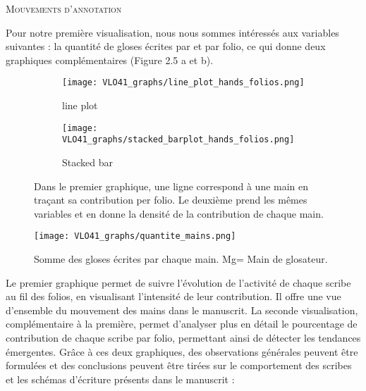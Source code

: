 \documentclass[a4paper, twoside, 12pt]{book}
\begin{document}
{\textsc{Mouvements d'annotation}

Pour notre première visualisation, nous nous sommes intéressés aux variables suivantes : la quantité de gloses écrites par et par folio, ce qui donne deux graphiques complémentaires (Figure 2.5 a et b).

\begin{figure}[H]
    \begin{subfigure}{0.55\textwidth}
    \centering
    \texttt{[image: VLO41\_graphs/line\_plot\_hands\_folios.png]}
    \caption{line plot}
    \end{subfigure}
    \begin{subfigure}{0,55\linewidth}
    \centering
    \texttt{[image: VLO41\_graphs/stacked\_barplot\_hands\_folios.png]}
    \caption{Stacked bar}
    \end{subfigure}
    \caption{Dans le premier graphique, une ligne correspond à une main en traçant sa contribution per folio. Le deuxième prend les mêmes variables et en donne la densité de la contribution de chaque main.}
    \label{fig:VLO41distribitionhands}
\end{figure} 

\begin{figure}[H]
    \centering
    \texttt{[image: VLO41\_graphs/quantite\_mains.png]}
    \caption{Somme des gloses écrites par chaque main. \og{}Mg\fg{}=  Main de glosateur.}
\end{figure}


Le premier graphique permet de suivre l'évolution de l'activité de chaque scribe au fil des folios, en visualisant l'intensité de leur contribution. Il offre une vue d'ensemble du mouvement des mains dans le manuscrit. La seconde visualisation, complémentaire à la première, permet d'analyser plus en détail le pourcentage de contribution de chaque scribe par folio, permettant ainsi de détecter les tendances émergentes. Grâce à ces deux graphiques, des observations générales peuvent être formulées et des conclusions peuvent être tirées sur le comportement des scribes et les schémas d'écriture présents dans le manuscrit : \\

}
\end{document}
